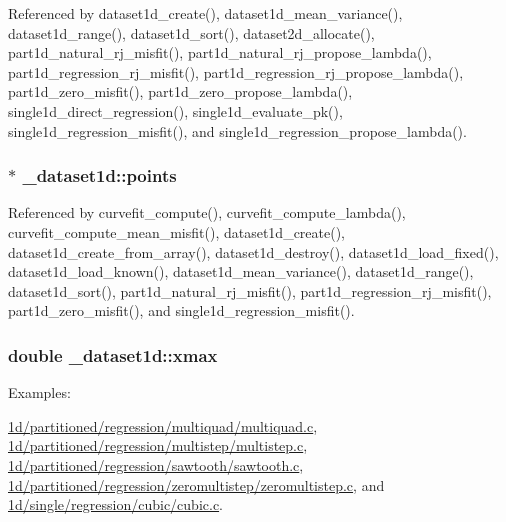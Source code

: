 Referenced by dataset1d\+\_\+create(), dataset1d\+\_\+mean\+\_\+variance(), dataset1d\+\_\+range(), dataset1d\+\_\+sort(), dataset2d\+\_\+allocate(), part1d\+\_\+natural\+\_\+rj\+\_\+misfit(), part1d\+\_\+natural\+\_\+rj\+\_\+propose\+\_\+lambda(), part1d\+\_\+regression\+\_\+rj\+\_\+misfit(), part1d\+\_\+regression\+\_\+rj\+\_\+propose\+\_\+lambda(), part1d\+\_\+zero\+\_\+misfit(), part1d\+\_\+zero\+\_\+propose\+\_\+lambda(), single1d\+\_\+direct\+\_\+regression(), single1d\+\_\+evaluate\+\_\+pk(), single1d\+\_\+regression\+\_\+misfit(), and single1d\+\_\+regression\+\_\+propose\+\_\+lambda().

\subsubsection[{\texorpdfstring{points}{points}}]{$\ast$ \+\_\+dataset1d\+::points}\hypertarget{struct__dataset1d_a88bbeb8e6e2273faefb175b91fcfae83}{}\label{struct__dataset1d_a88bbeb8e6e2273faefb175b91fcfae83}


Referenced by curvefit\+\_\+compute(), curvefit\+\_\+compute\+\_\+lambda(), curvefit\+\_\+compute\+\_\+mean\+\_\+misfit(), dataset1d\+\_\+create(), dataset1d\+\_\+create\+\_\+from\+\_\+array(), dataset1d\+\_\+destroy(), dataset1d\+\_\+load\+\_\+fixed(), dataset1d\+\_\+load\+\_\+known(), dataset1d\+\_\+mean\+\_\+variance(), dataset1d\+\_\+range(), dataset1d\+\_\+sort(), part1d\+\_\+natural\+\_\+rj\+\_\+misfit(), part1d\+\_\+regression\+\_\+rj\+\_\+misfit(), part1d\+\_\+zero\+\_\+misfit(), and single1d\+\_\+regression\+\_\+misfit().

\subsubsection[{\texorpdfstring{xmax}{xmax}}]{\setlength{\rightskip}{0pt plus 5cm}double \+\_\+dataset1d\+::xmax}\hypertarget{struct__dataset1d_a006b76fa7e80e3220e6ad66a1ee0b83f}{}\label{struct__dataset1d_a006b76fa7e80e3220e6ad66a1ee0b83f}
\begin{Desc}
\item[Examples\+: ]\par
\hyperlink{1d_2partitioned_2regression_2multiquad_2multiquad_8c-example}{1d/partitioned/regression/multiquad/multiquad.\+c}, \hyperlink{1d_2partitioned_2regression_2multistep_2multistep_8c-example}{1d/partitioned/regression/multistep/multistep.\+c}, \hyperlink{1d_2partitioned_2regression_2sawtooth_2sawtooth_8c-example}{1d/partitioned/regression/sawtooth/sawtooth.\+c}, \hyperlink{1d_2partitioned_2regression_2zeromultistep_2zeromultistep_8c-example}{1d/partitioned/regression/zeromultistep/zeromultistep.\+c}, and \hyperlink{1d_2single_2regression_2cubic_2cubic_8c-example}{1d/single/regression/cubic/cubic.\+c}.\end{Desc}


